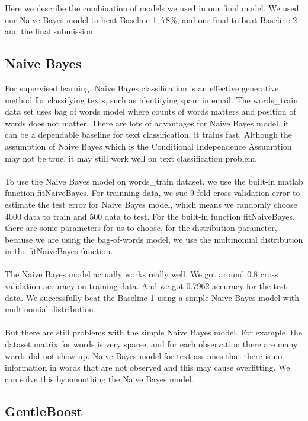 \documentclass[]{article}
\begin{document}
Here we describe the combination of models we used in our final model. We used our Naive Bayes model to beat Baseline 1, 78\%, and our final to beat Baseline 2 and the final submission. 


\subsection{Naive Bayes}

For supervised learning, Naive Bayes classification is an effective generative method for classifying texts, such as identifying spam in email. The words\_train data set uses bag of words model where counts of words matters and position of words does not matter. There are lots of advantages for Naive Bayes model, it can be a dependable baseline for text classification, it trains fast. Although the assumption of Naive Bayes which is the Conditional Independence Assumption may not be true, it may still work well on text classification problem.\\\\

To use the Naive Bayes model on words\_train dataset, we use the built-in matlab function fitNaiveBayes. For trainning data, we sue 9-fold cross validation error to estimate the test error for Naive Bayes model, which means we randomly choose 4000 data to train and 500 data to test. For the built-in function fitNaiveBayes, there are some parameters for us to choose, for the distribution parameter, because we are using the bag-of-words model, we use the multinomial distribution in the fitNaiveBayes function. \\\\

The Naive Bayes model actually works really well. We got around 0.8 cross validation accuracy on training data. And we got 0.7962 accuracy for the test data. We successfully beat the Baseline 1 using a simple Naive Bayes model with multinomial distribution. \\\\

But there are still problems with the simple Naive Bayes model. For example, the dataset matrix for words is very sparse, and for each observation there are many  words did not show up. Naive Bayes model for text assumes that there is no information in words that are not observed and this may cause overfitting. We can solve this by smoothing the Naive Bayes model.

\subsection{GentleBoost}
\end{document}
